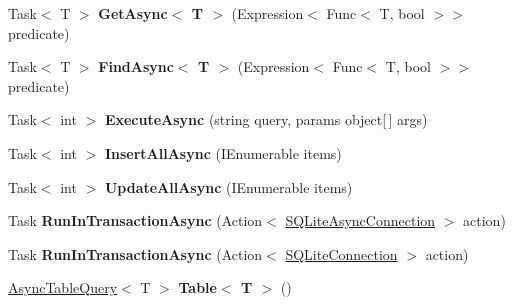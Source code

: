 \begin{DoxyCompactItemize}
\item 
\hypertarget{classSQLite_1_1SQLiteAsyncConnection_ad3e092c3fee0a61611570e8e86dbb88e}{}Task$<$ T $>$ {\bfseries Get\+Async$<$ T $>$} (Expression$<$ Func$<$ T, bool $>$$>$ predicate)\label{classSQLite_1_1SQLiteAsyncConnection_ad3e092c3fee0a61611570e8e86dbb88e}

\item 
\hypertarget{classSQLite_1_1SQLiteAsyncConnection_ab3ee9b32ac49766e4ac20fa697e91f99}{}Task$<$ T $>$ {\bfseries Find\+Async$<$ T $>$} (Expression$<$ Func$<$ T, bool $>$$>$ predicate)\label{classSQLite_1_1SQLiteAsyncConnection_ab3ee9b32ac49766e4ac20fa697e91f99}

\item 
\hypertarget{classSQLite_1_1SQLiteAsyncConnection_aa61f9b65944e23c32cac8b0e2c39d597}{}Task$<$ int $>$ {\bfseries Execute\+Async} (string query, params object\mbox{[}$\,$\mbox{]} args)\label{classSQLite_1_1SQLiteAsyncConnection_aa61f9b65944e23c32cac8b0e2c39d597}

\item 
\hypertarget{classSQLite_1_1SQLiteAsyncConnection_a8caf48d01bf96785143e71ee6a12b6a0}{}Task$<$ int $>$ {\bfseries Insert\+All\+Async} (I\+Enumerable items)\label{classSQLite_1_1SQLiteAsyncConnection_a8caf48d01bf96785143e71ee6a12b6a0}

\item 
\hypertarget{classSQLite_1_1SQLiteAsyncConnection_a42b8f062eb54f8649a2ccff9984b536e}{}Task$<$ int $>$ {\bfseries Update\+All\+Async} (I\+Enumerable items)\label{classSQLite_1_1SQLiteAsyncConnection_a42b8f062eb54f8649a2ccff9984b536e}

\item 
\hypertarget{classSQLite_1_1SQLiteAsyncConnection_affd521039f3a7da49746af600522c809}{}Task {\bfseries Run\+In\+Transaction\+Async} (Action$<$ \hyperlink{classSQLite_1_1SQLiteAsyncConnection}{S\+Q\+Lite\+Async\+Connection} $>$ action)\label{classSQLite_1_1SQLiteAsyncConnection_affd521039f3a7da49746af600522c809}

\item 
\hypertarget{classSQLite_1_1SQLiteAsyncConnection_a0d8abe01ee8f0afe93b6a38423d77029}{}Task {\bfseries Run\+In\+Transaction\+Async} (Action$<$ \hyperlink{classSQLite_1_1SQLiteConnection}{S\+Q\+Lite\+Connection} $>$ action)\label{classSQLite_1_1SQLiteAsyncConnection_a0d8abe01ee8f0afe93b6a38423d77029}

\item 
\hypertarget{classSQLite_1_1SQLiteAsyncConnection_ae222dcdcc5033294c43c9cef1b16fbe1}{}\hyperlink{classSQLite_1_1AsyncTableQuery}{Async\+Table\+Query}$<$ T $>$ {\bfseries Table$<$ T $>$} ()\label{classSQLite_1_1SQLiteAsyncConnection_ae222dcdcc5033294c43c9cef1b16fbe1}


\end{DoxyCompactItemize}
